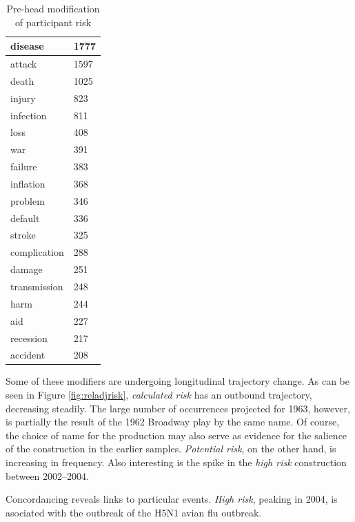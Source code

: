 \begin{table}
{\begin{minipage}{0.35\textwidth}
\begin{tabular}{|l|l|}
    disease            & 1777  \\ \hline
    attack             & 1597  \\ \hline
    death              & 1025  \\ \hline
    injury             & 823   \\ \hline
    infection          & 811   \\ \hline
    loss               & 408   \\ \hline
    war                & 391   \\ \hline
    failure            & 383   \\ \hline
    inflation          & 368   \\ \hline
    problem            & 346   \\ \hline
    default            & 336   \\ \hline
    stroke             & 325   \\ \hline
    complication       & 288   \\ \hline
    damage             & 251   \\ \hline
    transmission       & 248   \\ \hline
    harm               & 244   \\ \hline
    aid                & 227   \\ \hline
    recession          & 217   \\ \hline
    accident           & 208   \\ \hline
    \end{tabular}
    \caption{Pre-head modification of participant risk}
    \label{tab:posthead}
    \end{minipage}}
    \end{table}

    Some of these modifiers are undergoing longitudinal trajectory change. As can be seen in Figure \ref{fig:reladjrisk}, \emph{calculated risk} has an outbound trajectory, decreasing steadily. The large number of occurrences projected for 1963, however, is partially the result of the 1962 Broadway play by the same name. Of course, the choice of name for the production may also serve as evidence for the salience of the construction in the earlier samples.  \emph{Potential risk}, on the other hand, is increasing in frequency. Also interesting is the spike in the \emph{high risk} construction between 2002--2004. %

    Concordancing reveals links to particular events. \emph{High risk}, peaking in 2004, is asociated with the outbreak of the H5N1 avian flu outbreak. %

